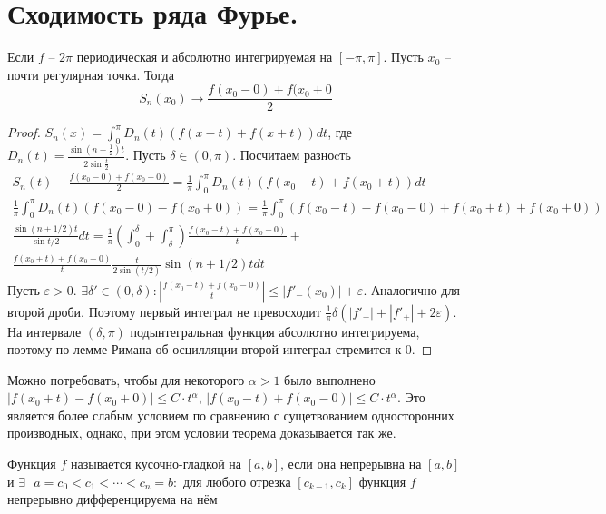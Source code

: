 \documentclass[document.tex]{subfiles}
\begin{document}
\section{Сходимость ряда Фурье.}
\begin{theorem}
	Если $f$ -- $2 \pi$ периодическая и абсолютно интегрируемая на $[-\pi, \pi]$. Пусть $x_0$ -- почти регулярная точка. Тогда
	$$S_n(x_0) \rightarrow \frac{f(x_0 - 0) + f(x_0 + 0}{2}$$
\end{theorem}
\begin{proof}
	$S_n(x) = \int_{0}^{\pi} D_n(t) (f(x-t) + f(x+t)) dt$, где $D_n(t) = \frac{\sin (n+\frac{1}{2}) t}{2 \sin \frac{t}{2}}$.
	Пусть $\delta \in (0, \pi)$. Посчитаем разноcть
	\begin{multline*}
		S_n(t) - \frac{f(x_0 - 0) + f(x_0 + 0)}{2} = \frac{1}{\pi}\int_{0}^{\pi}D_n(t)(f(x_0 - t) + f(x_0 + t)) dt -\\
		\frac{1}{\pi} \int_{0}^{\pi}D_n(t) (f(x_0 - 0) - f(x_0 + 0)) = \frac{1}{\pi} \int_{0}^{\pi} (f(x_0 - t) - f(x_0 - 0) + f(x_0 + t) + f(x_0 + 0))\\
		\frac{\sin (n + 1/2)t}{\sin t/2} dt = \frac{1}{\pi} \left( \int_{0}^{\delta} + \int_{\delta}^{\pi} \right)  \frac{f(x_0 - t) + f(x_0 - 0)}{t} + \\
		\frac{f(x_0 + t) + f(x_0 + 0)}{t} \frac{t}{2 \sin(t/2)} \sin (n + 1/2) t dt
	\end{multline*}
	Пусть $\varepsilon > 0$. $\exists \delta' \in (0, \delta) : |\frac{f(x_0 - t) + f(x_0 - 0)}{t}| \leq |f'_-(x_0)| + \varepsilon$. Аналогично для второй дроби. Поэтому первый интеграл не превосходит $\frac{1}{\pi} \delta (|f'_-| + |f'_+| + 2 \varepsilon)$. На интервале $(\delta, \pi)$ подынтегральная функция абсолютно интегрируема, поэтому по лемме Римана об осцилляции второй интеграл стремится к 0.
\end{proof}

\begin{remark}
	Можно потребовать, чтобы для некоторого $\alpha > 1$ было выполнено $|f(x_0 + t) - f(x_0 + 0)| \leq C \cdot t^{\alpha}$, $|f(x_0 - t) + f(x_0 - 0)| \leq C \cdot t^{\alpha}$. Это является более слабым условием по сравнению с сущетвованием односторонних производных, однако, при этом условии теорема доказывается так же.
\end{remark}

\begin{definition}
	Функция $f$ называется кусочно-гладкой на $[a, b]$, если она непрерывна на $[a, b]$ и $\exists \text{ } a = c_0 <c_1 < \cdots < c_n = b:$ для любого отрезка $[c_{k-1}, c_k]$ функция $f$  непрерывно дифференцируема на нём
\end{definition}
\end{document}
